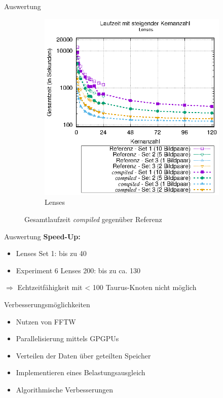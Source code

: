 \begin{frame}{Auswertung}
\begin{center}
\begin{figure}[h]
\begin{subfigure}[b]{0.45\textwidth}
			\includegraphics[width=\textwidth]{pdf/best_times_lenses}
			\caption{Lenses}
		\end{subfigure}
		\caption{Gesamtlaufzeit \textit{compiled} gegenüber Referenz}
	\end{figure}
	\end{center}
\end{frame}

\begin{frame}{Auswertung}
	\textbf{Speed-Up:}
	\begin{itemize}
		\item Lenses Set 1: bis zu 40
		\item Experiment 6 Lenses 200: bis zu ca. 130
	\end{itemize}
	$ \Rightarrow $ Echtzeitfähigkeit mit < 100 Taurus-Knoten nicht möglich
\end{frame}

\begin{frame}{Verbesserungsmöglichkeiten}
	\begin{itemize}
		\item Nutzen von FFTW
		\item Parallelisierung mittels GPGPUs
		\item Verteilen der Daten über geteilten Speicher
		\item Implementieren eines Belastungsausgleich
		\item Algorithmische Verbesserungen
	\end{itemize}
\end{frame}